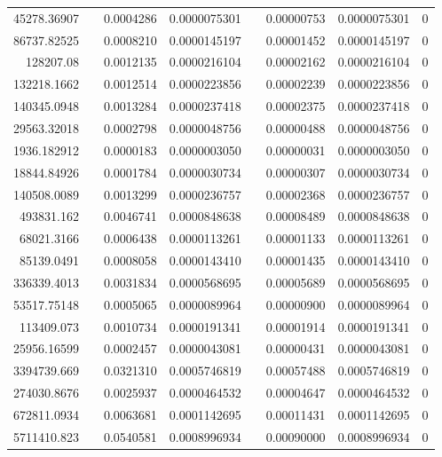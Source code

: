 \documentclass[
journal=jacsat, %
manuscript=article]{achemso}
\begin{document}
\begin{table}[htbp]
{\begin{tabular}{rrrrrrrr}
    45278.36907 &       & 0.0004286 & 0.0000075301 &       & 0.00000753 & 0.0000075301 & 0 \\
    86737.82525 &       & 0.0008210 & 0.0000145197 &       & 0.00001452 & 0.0000145197 & 0 \\
    128207.08 &       & 0.0012135 & 0.0000216104 &       & 0.00002162 & 0.0000216104 & 0 \\
    132218.1662 &       & 0.0012514 & 0.0000223856 &       & 0.00002239 & 0.0000223856 & 0 \\
    140345.0948 &       & 0.0013284 & 0.0000237418 &       & 0.00002375 & 0.0000237418 & 0 \\
    29563.32018 &       & 0.0002798 & 0.0000048756 &       & 0.00000488 & 0.0000048756 & 0 \\
    1936.182912 &       & 0.0000183 & 0.0000003050 &       & 0.00000031 & 0.0000003050 & 0 \\
    18844.84926 &       & 0.0001784 & 0.0000030734 &       & 0.00000307 & 0.0000030734 & 0 \\
    140508.0089 &       & 0.0013299 & 0.0000236757 &       & 0.00002368 & 0.0000236757 & 0 \\
    493831.162 &       & 0.0046741 & 0.0000848638 &       & 0.00008489 & 0.0000848638 & 0 \\
    68021.3166 &       & 0.0006438 & 0.0000113261 &       & 0.00001133 & 0.0000113261 & 0 \\
    85139.0491 &       & 0.0008058 & 0.0000143410 &       & 0.00001435 & 0.0000143410 & 0 \\
    336339.4013 &       & 0.0031834 & 0.0000568695 &       & 0.00005689 & 0.0000568695 & 0 \\
    53517.75148 &       & 0.0005065 & 0.0000089964 &       & 0.00000900 & 0.0000089964 & 0 \\
    113409.073 &       & 0.0010734 & 0.0000191341 &       & 0.00001914 & 0.0000191341 & 0 \\
    25956.16599 &       & 0.0002457 & 0.0000043081 &       & 0.00000431 & 0.0000043081 & 0 \\
    3394739.669 &       & 0.0321310 & 0.0005746819 &       & 0.00057488 & 0.0005746819 & 0 \\
    274030.8676 &       & 0.0025937 & 0.0000464532 &       & 0.00004647 & 0.0000464532 & 0 \\
    672811.0934 &       & 0.0063681 & 0.0001142695 &       & 0.00011431 & 0.0001142695 & 0 \\
    5711410.823 &       & 0.0540581 & 0.0008996934 &       & 0.00090000 & 0.0008996934 & 0 \\

\end{tabular}}
\end{table}
\end{document}

